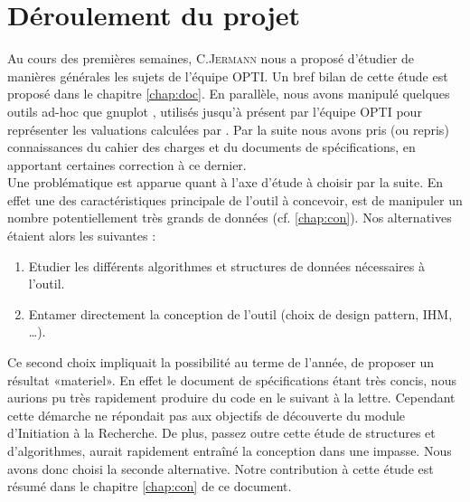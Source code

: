 \section{Déroulement du projet}
Au cours des premières semaines, C.\textsc{Jermann} nous a proposé d'étudier de manières générales les sujets de l'équipe \textsc{OPTI}. Un bref bilan de cette étude est proposé dans le chapitre \ref{chap:doc}. En parallèle, nous avons manipulé quelques outils ad-hoc que gnuplot \cite{gnu}, utilisés jusqu'à présent par l'équipe \textsc{OPTI} pour représenter les valuations calculées par \realpaver. Par la suite nous avons pris (ou repris) connaissances du cahier des charges et du documents de spécifications, en apportant certaines correction à ce dernier.  \\
Une problématique est apparue quant à l'axe d'étude à choisir par la suite. En effet une des caractéristiques principale de l'outil à concevoir, est de manipuler un nombre potentiellement très grands de données (cf. \ref{chap:con}). Nos alternatives étaient alors les suivantes : 
\begin{enumerate}
\item
Etudier les différents algorithmes et structures de données nécessaires à l'outil.
\item
Entamer directement la conception de l'outil (choix de design pattern, IHM, \dots).
\end{enumerate} 
Ce second choix impliquait la possibilité au terme de l'année, de proposer un résultat «materiel». En effet le document de spécifications étant très concis, nous aurions pu très rapidement produire du code en le suivant à la lettre. Cependant cette démarche ne répondait pas aux objectifs de découverte du module d'Initiation à la Recherche. De plus, passez outre cette étude de structures et d'algorithmes, aurait rapidement entraîné la conception dans une impasse. Nous avons donc choisi la seconde alternative. Notre contribution à cette étude est résumé dans le chapitre \ref{chap:con} de ce document.

